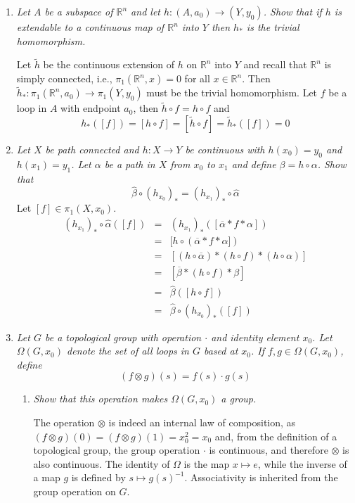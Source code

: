 \documentclass[10pt]{article}
\newcommand{\R}{\mathbb{R}}
\begin{document}
\begin{enumerate}
\item \emph{Let $A$ be a subspace of $\R^n$ and let $h : (A, a_0) \rightarrow (Y,y_0)$.  Show that if $h$ is extendable to a continuous map of $\R^n$ into $Y$ then $h_\ast$ is the trivial homomorphism.}

Let $\tilde{h}$ be the continuous extension of $h$ on $\R^n$ into $Y$ and recall that $\R^n$ is simply connected, i.e., $\pi_1(\R^n, x) = 0$ for all $x \in \R^n$.  Then $\tilde{h}_\ast: \pi_1(\R^n, a_0) \rightarrow \pi_1(Y,y_0)$ must be the trivial homomorphism.  Let $f$ be a loop in $A$ with endpoint $a_0$, then $\tilde{h} \circ f = h \circ f$ and $$h_\ast([f]) = [h \circ f] = [\tilde{h} \circ f] = \tilde{h}_\ast([f]) = 0$$

\item \emph{Let $X$ be path connected and $h: X \rightarrow Y$ be continuous with $h(x_0) = y_0$ and $h(x_1) = y_1$.  Let $\alpha$ be a path in $X$ from $x_0$ to $x_1$ and define $\beta = h \circ \alpha$.  Show that $$\hat{\beta} \circ (h_{x_0})_\ast = (h_{x_1})_\ast \circ \hat{\alpha}$$}
Let $[f] \in \pi_1(X,x_0)$.
\begin{eqnarray*}
(h_{x_1})_\ast \circ \hat{\alpha}([f]) &=& (h_{x_1})_\ast ([\overline{\alpha} \ast f \ast \alpha]) \\
&=& [h \circ(\overline{\alpha} \ast f \ast \alpha]) \\
&=& [(h \circ \overline{\alpha}) \ast (h \circ f) \ast (h \circ \alpha)] \\
&=& [\overline{\beta} \ast (h \circ f) \ast \beta] \\
&=& \hat{\beta}([h \circ f]) \\
&=& \hat{\beta} \circ (h_{x_0})_\ast([f])
\end{eqnarray*}

\item \emph{Let $G$ be a topological group with operation $\cdot$ and identity element $x_0$.  Let $\Omega(G,x_0)$ denote the set of all loops in $G$ based at $x_0$.  If $f,g \in \Omega(G,x_0)$, define $$(f \otimes g)(s) = f(s) \cdot g(s)$$}
\begin{enumerate}
\item \emph{Show that this operation makes $\Omega(G,x_0)$ a group.}

The operation $\otimes$ is indeed an internal law of composition, as $(f \otimes g)(0) = (f \otimes g)(1) = x_0^2 = x_0$ and, from the definition of a topological group, the group operation $\cdot$ is continuous, and therefore $\otimes$ is also continuous.  The identity of $\Omega$ is the map $x \mapsto e$, while the inverse of a map $g$ is defined by $s \mapsto g(s)^{-1}$.  Associativity is inherited from the group operation on $G$.


\end{enumerate}
\end{enumerate}
\end{document}

